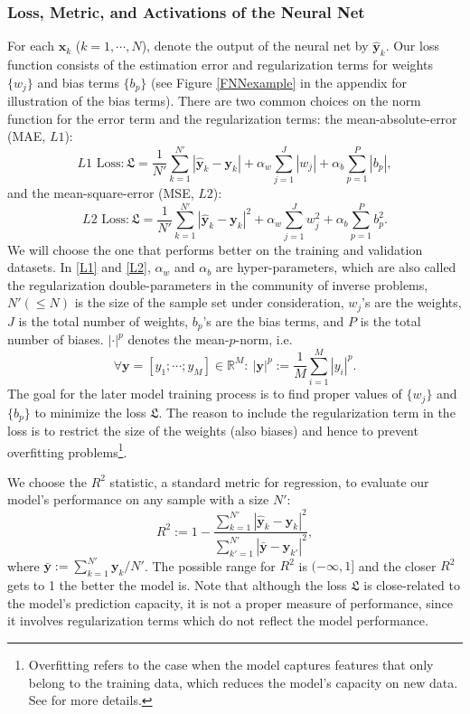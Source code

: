 \documentclass[thmsa,onecolumn,12pt]{article}%
\begin{document}
\subsubsection{Loss, Metric, and Activations of the Neural Net}
For each $\mathbf{x}_k$ ($k=1,\cdots,N$), denote the output of the neural net by $\hat{\mathbf{y}}_k$. Our loss function consists of the estimation error and regularization terms for weights $\{w_j\}$ and bias terms $\{b_p\}$  (see Figure \ref{FNNexample} in the appendix for illustration of the bias terms). There are two common choices on the norm function for the error term and the regularization terms: the mean-absolute-error (MAE, $L1$):
\begin{equation}
L1 \text{ Loss}: \mathfrak{L} = \frac{1}{N'}\sum_{k=1}^{N'} |\hat{\mathbf{y}}_k-\mathbf{y}_k| + \alpha_w\sum_{j=1}^J |w_j| + \alpha_b \sum_{p=1}^P |b_p|,
\label{L1}
\end{equation}
and the mean-square-error (MSE, $L2$):
\begin{equation}
L2 \text{ Loss}: \mathfrak{L} = \frac{1}{N'}\sum_{k=1}^{N'} |\hat{\mathbf{y}}_k-\mathbf{y}_k|^{2} + \alpha_w\sum_{j=1}^J w_j^2 + \alpha_b \sum_{p=1}^P b_p^2.
\label{L2}
\end{equation}
We will choose the one that performs better on the training and validation datasets. In \eqref{L1} and \eqref{L2}, $\alpha_w$ and $\alpha_b$ are hyper-parameters, which are also called the regularization double-parameters in the community of inverse problems, $N'(\leq N)$ is the size of the sample set under consideration, $w_j$'s are the weights, $J$ is the total number of weights, $b_p$'s are the bias terms, and $P$ is the total number of biases. $|\cdot|^p$ denotes the mean-$p$-norm, i.e.
\[ \forall \mathbf{y}=[y_1; \cdots; y_M]\in \mathbb{R}^M: ~ |\mathbf{y}|^p := \frac{1}{M}\sum_{i=1}^{M} |y_i|^p.\]
The goal for the later model training process is to find proper values of $\{w_j\}$ and $\{b_p\}$ to minimize the loss $\mathfrak{L}$. The reason to include the regularization term in the loss is to restrict the size of the weights (also biases) and hence to prevent overfitting problems\footnote{Overfitting refers to the case when the model captures features that only belong to the training data, which reduces the model's capacity on new data. See \cite[\S 11.5.2]{Hastie2009} for more details.}.

We choose the $R^2$ statistic, a standard metric for regression, to evaluate our model's performance on any sample with a size $N'$:
\[ R^2 := 1 - \frac{\sum_{k=1}^{N'} |\hat{\mathbf{y}}_k-\mathbf{y}_k|^2}{\sum_{k'=1}^{N'}|\bar{\mathbf{y}}-\mathbf{y}_{k'}|^2}, \]
where $\bar{\mathbf{y}}:=\sum_{k=1}^{N'}\mathbf{y}_k/N'$.
The possible range for $R^2$ is $(-\infty,1]$ and the closer $R^2$ gets to 1 the better the model is. Note that although the loss $\mathfrak{L}$ is close-related to the model's prediction capacity, it is not a proper measure of performance, since it involves regularization terms which do not reflect the model performance.
\end{document}
